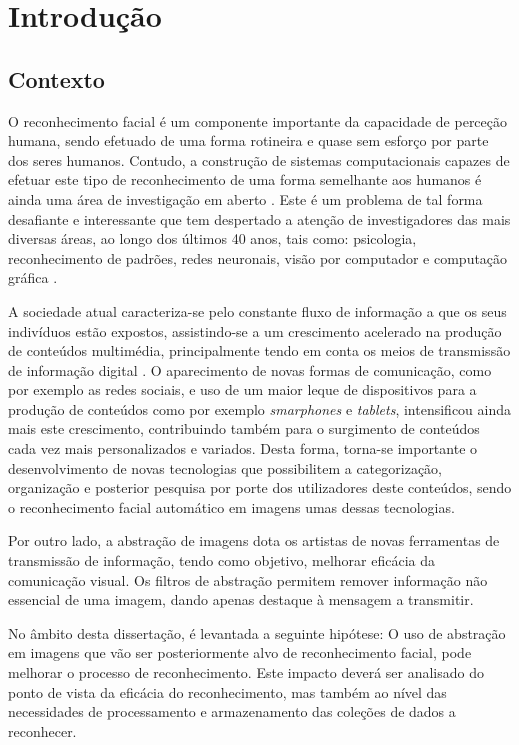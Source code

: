 \chapter{Introdução} \label{chap:intro}

\section{Contexto} \label{sec:context}
O reconhecimento facial é um componente importante da capacidade de perceção humana, sendo efetuado de uma forma rotineira e quase sem esforço por parte dos seres humanos. Contudo, a construção de sistemas computacionais capazes de efetuar este tipo de reconhecimento de uma forma semelhante aos humanos é ainda uma área de investigação em aberto \citep{Li2011}. Este é um problema de tal forma desafiante e interessante que tem despertado a atenção de investigadores das mais diversas áreas, ao longo dos últimos 40 anos, tais como: psicologia, reconhecimento de padrões, redes neuronais, visão por computador e computação gráfica \citep{Zhao2003}.

A sociedade atual caracteriza-se pelo constante fluxo de informação a que os seus indivíduos estão expostos, assistindo-se a um crescimento acelerado na produção de conteúdos multimédia, principalmente tendo em conta os meios de transmissão de informação digital \citep{IntelCorporation}. O aparecimento de novas formas de comunicação, como por exemplo as redes sociais, e uso de um maior leque de dispositivos para a produção de conteúdos como por exemplo \textit{smarphones} e \textit{tablets}, intensificou ainda mais este crescimento, contribuindo também para o surgimento de conteúdos cada vez mais personalizados e variados. Desta forma, torna-se importante o desenvolvimento de novas tecnologias que possibilitem a categorização, organização e posterior pesquisa por porte dos utilizadores deste conteúdos, sendo o reconhecimento facial automático em imagens umas dessas tecnologias.

Por outro lado, a abstração de imagens dota os artistas de novas ferramentas de transmissão de informação, tendo como objetivo, melhorar eficácia da comunicação visual. Os filtros de abstração permitem remover informação não essencial de uma imagem, dando apenas destaque à mensagem a transmitir. 

No âmbito desta dissertação, é levantada a seguinte hipótese: O uso de abstração em imagens que vão ser posteriormente alvo de reconhecimento facial, pode melhorar o processo de reconhecimento. Este impacto deverá ser analisado do ponto de vista da eficácia do reconhecimento, mas também ao nível das necessidades de processamento e armazenamento das coleções de dados a reconhecer.

